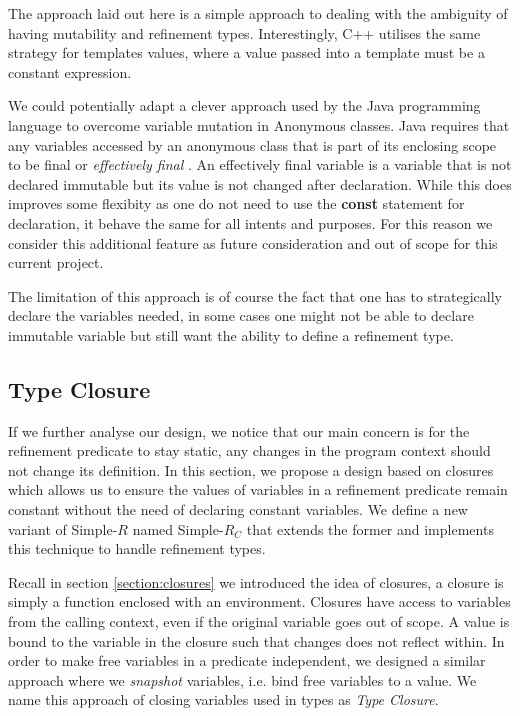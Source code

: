 \documentclass[a4paper,12pt]{report}
\begin{document}
\par
The approach laid out here is a simple approach to dealing with the ambiguity of 
having mutability and refinement types. Interestingly, C++ utilises the same 
strategy for templates values, where a value passed into a template must be a 
constant expression. 

\par
We could potentially adapt a clever approach used by the Java programming 
language to overcome variable mutation in Anonymous classes. Java requires that 
any variables accessed by an anonymous class that is part of 
its enclosing scope to be final or \textit{effectively final} 
\cite{effectFinal}. An effectively final variable is a variable that is not 
declared immutable but its value is not changed after declaration. While this 
does improves some flexibity as one do not need to use the \textbf{const} 
statement for declaration, it behave the same for all intents and purposes. 
For this reason we consider this additional feature as future consideration and 
out of scope for this current project. 

\par
The limitation of this approach is of course the fact that one has to strategically 
declare the variables needed, in some cases one might not be able to declare 
immutable variable but still want the ability to define a refinement type.

\subsection{Type Closure}
If we further analyse our design, we notice that our main concern is for the 
refinement predicate to stay static, any changes in the program context should 
not change its definition. In this section, we propose a design based on closures 
which allows us to ensure the values of variables in a refinement predicate remain 
constant without the need of declaring constant variables. We define a new variant of 
Simple-$R$ named Simple-$R_{C}$ that extends the former and implements this 
technique to handle refinement types. 

\par
Recall in section \ref{section:closures} we introduced the idea of closures, a 
closure is simply a function enclosed with an environment. Closures have access to 
variables from the calling context, even if the original variable goes out of 
scope. A value is bound to the variable in the closure such that changes does 
not reflect within. In order to make free variables in a predicate independent, 
we designed a similar approach where we \emph{snapshot} variables, i.e. 
bind free variables to a value. We name this approach of closing 
variables used in types as \emph{Type Closure}. 
\end{document}

